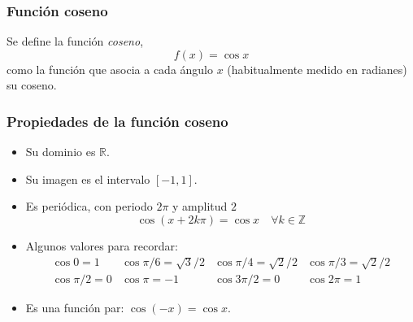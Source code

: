 \begin{frame}
\frametitle{Función coseno}
\begin{definicion}
Se define la función \emph{coseno},
\[f(x)=\cos x\]
como la función que asocia a cada ángulo $x$ (habitualmente medido en radianes) su coseno.
\end{definicion}
\begin{center}
\scalebox{1}{}
\end{center}
\end{frame} 

\begin{frame}
\frametitle{Propiedades de la función coseno}
\begin{itemize}
\item Su dominio es $\mathbb{R}$.
\item Su imagen es el intervalo $[-1,1]$.
\item Es periódica, con periodo $2\pi$ y amplitud $2$
\[\cos (x+2k\pi)= \cos x\quad \forall k\in \mathbb{Z}\]
\item Algunos valores para recordar:
\[
\begin{array}{llll}
\cos 0=1 & \cos \pi/6= \sqrt{3}/2 & \cos \pi/4=\sqrt{2}/2 & \cos \pi/3= \sqrt{2}/2\\
\cos \pi/2 =0 & \cos \pi = -1 & \cos 3\pi/2=0 & \cos 2\pi=1
\end{array}
\]
\item Es una función par: $\cos(-x)=\cos x$.
\end{itemize}
\end{frame} 


